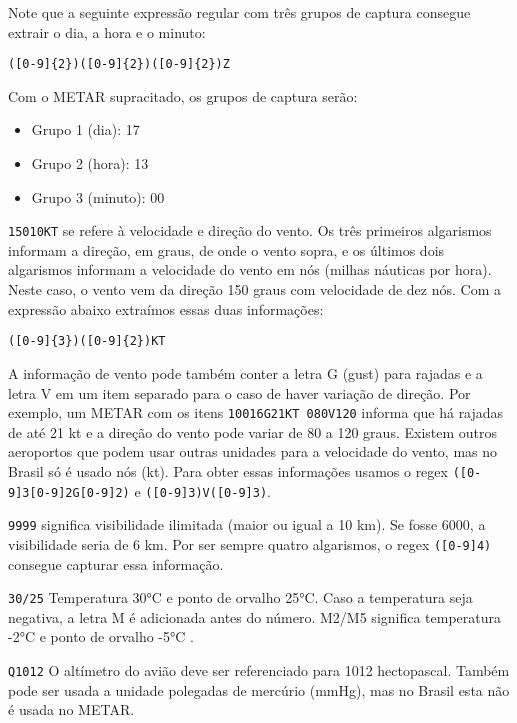Note que a seguinte expressão regular com três grupos de captura consegue extrair o dia, a hora e o minuto:

\begin{verbatim}
([0-9]{2})([0-9]{2})([0-9]{2})Z
\end{verbatim}

Com o METAR supracitado, os grupos de captura serão:

\begin{itemize}
\item Grupo 1 (dia): 17
\item Grupo 2 (hora): 13
\item Grupo 3 (minuto): 00
\end{itemize}

\texttt{15010KT} se refere à velocidade e direção do vento. Os três primeiros algarismos informam a direção, 
em graus, de onde o vento sopra, e os últimos dois algarismos informam a velocidade do vento em nós (milhas náuticas por hora). 
Neste caso, o vento vem da direção 150 graus com velocidade de dez nós. Com a expressão abaixo extraímos essas duas informações:

\begin{verbatim}
([0-9]{3})([0-9]{2})KT
\end{verbatim}

A informação de vento pode também conter a letra G (gust) para rajadas e a letra V em um item separado para o 
caso de haver variação de direção. Por exemplo, um METAR com os itens \texttt{10016G21KT 080V120} informa que 
há rajadas de até 21 kt e a direção do vento pode variar de 80 a 120 graus. Existem outros aeroportos que podem 
usar outras unidades para a velocidade do vento, mas no Brasil só é usado nós (kt). Para obter essas informações 
usamos o regex \texttt{([0-9]{3}[0-9]{2}G{[0-9]{2}})} e \texttt{([0-9]{3})V([0-9]{3})}.

\texttt{9999} significa visibilidade ilimitada (maior ou igual a 10 km). Se fosse 6000, a visibilidade seria de 
6 km. Por ser sempre quatro algarismos, o regex \texttt{([0-9]{4})} consegue capturar essa informação.

\texttt{30/25} Temperatura 30°C e ponto de orvalho 25°C. Caso a temperatura seja negativa, a letra M é adicionada 
antes do número. M2/M5 significa temperatura -2°C e ponto de orvalho -5°C \cite{METAR-help}.

\texttt{Q1012} O altímetro do avião deve ser referenciado para 1012 hectopascal. Também pode ser usada a unidade 
polegadas de mercúrio (mmHg), mas no Brasil esta não é usada no METAR.

